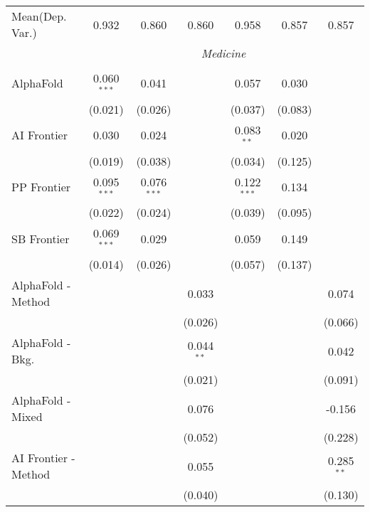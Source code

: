 \begin{tabular}{lcccccc}
Mean(Dep. Var.) & 0.932 & 0.860 & 0.860 & 0.958 & 0.857 & 0.857 \\
 & \multicolumn{6}{c}{\textit{Medicine}} \\ \\
   AlphaFold            & 0.060$^{***}$ & 0.041         &               & 0.057         & 0.030   &   \\   
                        & (0.021)       & (0.026)       &               & (0.037)       & (0.083) &   \\   
   AI Frontier          & 0.030         & 0.024         &               & 0.083$^{**}$  & 0.020   &   \\   
                        & (0.019)       & (0.038)       &               & (0.034)       & (0.125) &   \\   
   PP Frontier          & 0.095$^{***}$ & 0.076$^{***}$ &               & 0.122$^{***}$ & 0.134   &   \\   
                        & (0.022)       & (0.024)       &               & (0.039)       & (0.095) &   \\   
   SB Frontier          & 0.069$^{***}$ & 0.029         &               & 0.059         & 0.149   &   \\   
                        & (0.014)       & (0.026)       &               & (0.057)       & (0.137) &   \\   
   AlphaFold - Method   &               &               & 0.033         &               &         & 0.074\\   
                        &               &               & (0.026)       &               &         & (0.066)\\   
   AlphaFold - Bkg.     &               &               & 0.044$^{**}$  &               &         & 0.042\\   
                        &               &               & (0.021)       &               &         & (0.091)\\   
   AlphaFold - Mixed    &               &               & 0.076         &               &         & -0.156\\   
                        &               &               & (0.052)       &               &         & (0.228)\\   
   AI Frontier - Method &               &               & 0.055         &               &         & 0.285$^{**}$\\   
                        &               &               & (0.040)       &               &         & (0.130)\\   

\end{tabular}
